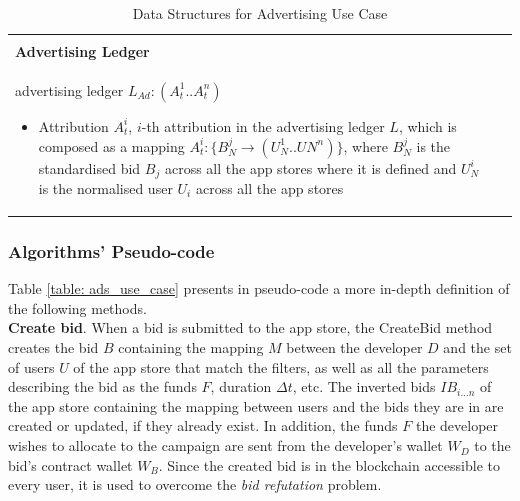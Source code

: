 \begin{table}[H]
\begin{tabular}{|p{}p{}|}
\begin{itemize}
\end{itemize} \\
\textbf{Advertising Ledger} & \\
advertising ledger $L_{Ad} : (A^{1}_{t}..A^{n}_{t})$
\begin{itemize}
	\item Attribution $A^{i}_{t}$, $i$-th attribution in the advertising ledger $L$, which is composed as a mapping $A^{i}_{t} : \{B_{N}^{j} \to (U_{N}^{1}..U{N}^{n})\}$, where $B_{N}^{j}$ is the standardised bid $B_j$ across all the app stores where it is defined and $U_{N}^{i}$ is the normalised user $U_i$ across all the app stores
\end{itemize} & \\
\hline
\end{tabular}
\caption{Data Structures for Advertising Use Case}
\label{table: data_structures_ad}
\end{table}


\subsubsection{Algorithms' Pseudo-code}

Table \ref{table: ads_use_case} presents in pseudo-code a more in-depth definition of the following methods. \\

\noindent \textbf{Create bid}. When a bid is submitted to the app store, the \textsf{CreateBid} method creates the bid $B$ containing the mapping $M$ between the developer $D$ and the set of users $U$ of the app store that match the filters, as well as all the parameters describing the bid as the funds $F$, duration $\Delta t$, etc. The inverted bids $IB_{i...n}$ of the app store containing the mapping between users and the bids they are in are created or updated, if they already exist. In addition, the funds $F$ the developer wishes to allocate to the campaign are sent from the developer's wallet $W_D$ to the bid's contract wallet $W_B$. Since the created bid is in the blockchain accessible to every user, it is used to overcome the \textit{bid refutation} problem.\\

